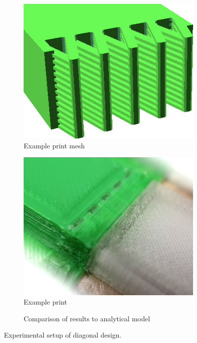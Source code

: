 \begin{figure}
	\centering
	\begin{subfigure}[B]{.24\columnwidth}
		\centering
		\includegraphics[width=\columnwidth]{sources/testing/diagonal_sample.jpg}
		\caption{Example print mesh}
		\label{fig:test_diagonal_boundary_cells}
	\end{subfigure}
	\begin{subfigure}[B]{.24\columnwidth}
		\centering
		\includegraphics[width=\columnwidth]{sources/testing/straight_print.jpg}
		\caption{Example print}
	\end{subfigure}
	\begin{subfigure}[B]{.5\columnwidth}
		\centering
		\caption{Comparison of results to analytical model}
	\end{subfigure}
	\caption{Experimental setup of diagonal design.}
\end{figure}




